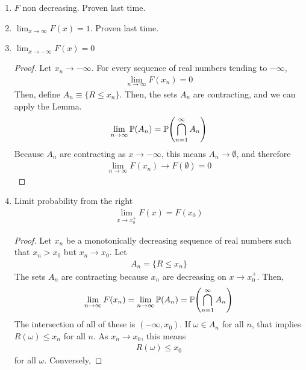 \begin{enumerate}
    \item $F$ non decreasing. Proven last time.
    \item $\lim_{x \to\infty} F(x) = 1$. Proven last time.
    \item $\lim_{x \to{-\infty}} F(x) = 0$
    \begin{proof}
        Let $x_n \to -\infty$. For every sequence of real numbers tending to $-\infty$,
        \begin{align}
            \lim_{n \to \infty} F(x_n) = 0
        \end{align}
        Then, define $A_n \equiv \{ R \le x_n \}$. Then, the sets $A_n$ are contracting, and we can apply the Lemma.
        \begin{align}
            \lim_{n \to \infty} \mathbb{P}(A_n) = \mathbb{P}\qty(\bigcap_{n=1}^\infty A_n)
        \end{align}
        Because $A_n$ are contracting as $x \to -\infty$, this means $A_n \to \emptyset$, and therefore
        \begin{align}
            \lim_{n \to \infty} F(x_n) \to F(\emptyset) = 0
        \end{align}
    \end{proof}
    \item Limit probability from the right
    \begin{align}
        \lim_{x \to x_0^+} F(x) = F(x_0)
    \end{align}
    \begin{proof}    
        Let $x_n$ be a monotonically decreasing sequence of real numbers such that $x_n > x_0$ but $x_n \to x_0$. Let
        \begin{align}
            A_n = \{ R \le x_n \}
        \end{align}
        The sets $A_n$ are contracting because $x_n$ are decreasing on $x \to x_0^+$. Then,
        \begin{align}
            \lim_{n \to \infty} F(x_n) = \lim_{n \to \infty} \mathbb{P}(A_n) = \mathbb{P}\qty(\bigcap_{n=1}^\infty A_n)
        \end{align}
        The intersection of all of these is $(-\infty, x_0)$. If $\omega \in A_n$ for all $n$, that implies $R(\omega) \le x_n$ for all $n$. As $x_n \to x_0$, this means
        \begin{align}
            R(\omega) \le x_0
        \end{align}
        for all $\omega$. Conversely,
    \end{proof}

\end{enumerate}
